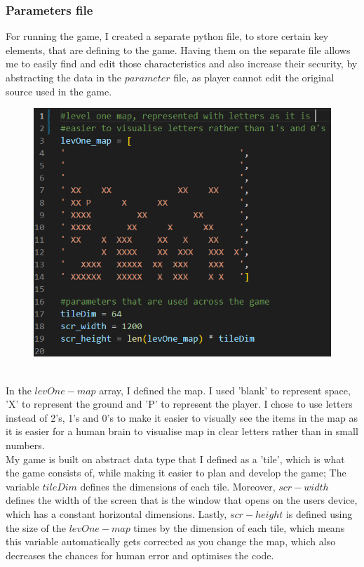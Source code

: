 \documentclass[12pt]{article}
\begin{document}
\subsubsection{Parameters file}
For running the game, I created a separate python file, to store certain key elements, that are defining to the game. Having them on the separate file allows me to easily find and edit those characteristics and also increase their security, by abstracting the data in the $parameter$ file, as player cannot edit the original source used in the game.\\
\begin{figure}[H]
    \includegraphics[width = 15cm]{Parameters/para1.png}
    \centering
\end{figure}\\
In the $levOne-map$ array, I defined the map. I used 'blank' to represent space, 'X' to represent the ground and 'P' to represent the player. I chose to use letters instead of 2's, 1's and 0's to make it easier to visually see the items in the map as it is easier for a human brain to visualise map in clear letters rather than in small numbers.\\
My game is built on abstract data type that I defined as a 'tile', which is what the game consists of, while making it easier to plan and develop the game; The variable $tileDim$ defines the dimensions of each tile. Moreover, $scr-width$ defines the width of the screen that is the window that opens on the users device, which has a constant horizontal dimensions. Lastly, $scr-height$ is defined using the size of the $levOne-map$ times by the dimension of each tile, which means this variable automatically gets corrected as you change the map, which also decreases the chances for human error and optimises the code.
\end{document}
